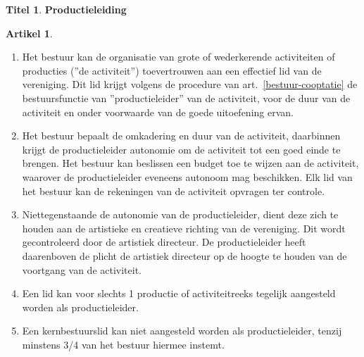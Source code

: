 \documentclass[a4paper,10pt]{article}
\theoremstyle{definition}
\newtheorem{titel}{\newline\Large Titel}
\newtheorem{artikel}{\large Artikel}
\newcommand{\ttext}[1]{\Large \textbf{#1} \normalsize}
\newcommand{\ttextenum}{\mbox{}}
\begin{document}
\newpage
\begin{titel}\ttext{Productieleiding}

  \begin{artikel}\label{bestuur-productie}\ttextenum
    \begin{enumerate}
      \item
        Het bestuur kan de organisatie van grote of wederkerende activiteiten of producties (''de activiteit'') toevertrouwen aan een effectief lid van de vereniging.
        Dit lid krijgt volgens de procedure van art.~\ref{bestuur-cooptatie} de bestuursfunctie van ''productieleider'' van de activiteit, voor de duur van de activiteit en onder voorwaarde van de goede uitoefening ervan.
      \item
        Het bestuur bepaalt de omkadering en duur van de activiteit, daarbinnen krijgt de productieleider autonomie om de activiteit tot een goed einde te brengen.
        Het bestuur kan beslissen een budget toe te wijzen aan de activiteit, waarover de productieleider eveneens autonoom mag beschikken.
        Elk lid van het bestuur kan de rekeningen van de activiteit opvragen ter controle.
      \item
        Niettegenstaande de autonomie van de productieleider, dient deze zich te houden aan de artistieke en creatieve richting van de vereniging.
        Dit wordt gecontroleerd door de artistiek directeur.
        De productieleider heeft daarenboven de plicht de artistiek directeur op de hoogte te houden van de voortgang van de activiteit.
      \item
        Een lid kan voor slechts 1 productie of activiteitreeks tegelijk aangesteld worden als productieleider.
      \item
        Een kernbestuurslid kan niet aangesteld worden als productieleider, tenzij minstens 3/4 van het bestuur hiermee instemt.
    \end{enumerate}
  \end{artikel}


\end{titel}
\end{document}
